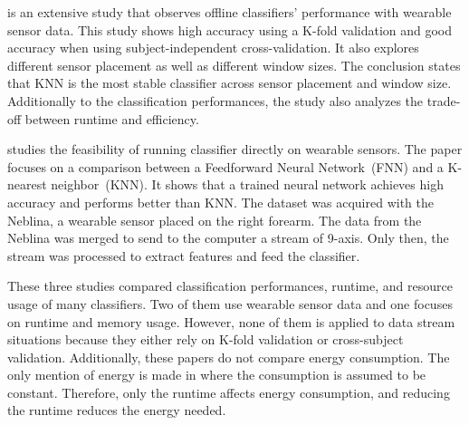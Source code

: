 \cite{Janidarmian_2017} is an extensive study that
observes offline classifiers' performance with
wearable sensor data. This study shows high
accuracy using a K-fold validation and good
accuracy when using subject-independent
cross-validation. It also explores different
sensor placement as well as different window
sizes. The conclusion states that KNN is the most
stable classifier across sensor placement and
window size. Additionally to the classification
performances, the study also analyzes the
trade-off between runtime and efficiency.

\cite{omid_2019} studies the feasibility of
running classifier directly on wearable sensors.
The paper focuses on a comparison between a
Feedforward Neural Network~(FNN) and a K-nearest
neighbor~(KNN). It shows that a trained neural
network achieves high accuracy and performs better
than KNN. The dataset was acquired with the
Neblina, a wearable sensor placed on the right
forearm. The data from the Neblina was merged to
send to the computer a stream of 9-axis. Only
then, the stream was processed to extract features
and feed the classifier.

These three studies compared classification
performances, runtime, and resource usage of many
classifiers. Two of them use wearable sensor data
and one focuses on runtime and memory usage.
However, none of them is applied to data stream
situations because they either rely on K-fold
validation or cross-subject validation.
Additionally, these papers do not compare energy
consumption. The only mention of energy is made in
\cite{omid_2019} where the consumption is assumed to be
constant. Therefore, only the runtime affects 
energy consumption, and reducing the runtime
reduces the energy needed.


